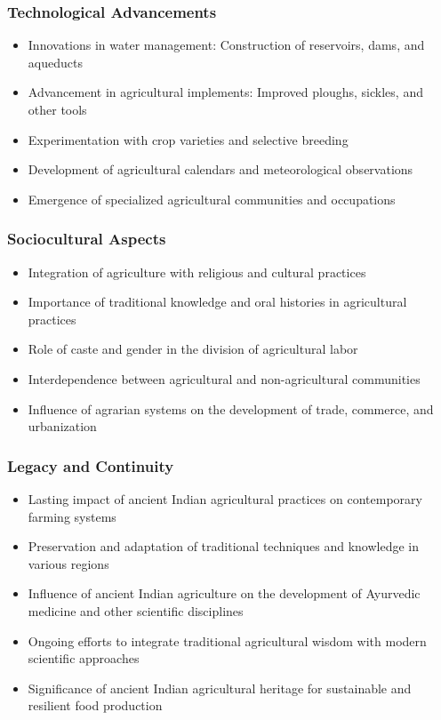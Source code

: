 \begin{frame}[fragile]\frametitle{Technological Advancements}
    \begin{itemize}
        \item Innovations in water management: Construction of reservoirs, dams, and aqueducts
        \item Advancement in agricultural implements: Improved ploughs, sickles, and other tools
        \item Experimentation with crop varieties and selective breeding
        \item Development of agricultural calendars and meteorological observations
        \item Emergence of specialized agricultural communities and occupations
    \end{itemize}
\end{frame}

\begin{frame}[fragile]\frametitle{Sociocultural Aspects}
    \begin{itemize}
        \item Integration of agriculture with religious and cultural practices
        \item Importance of traditional knowledge and oral histories in agricultural practices
        \item Role of caste and gender in the division of agricultural labor
        \item Interdependence between agricultural and non-agricultural communities
        \item Influence of agrarian systems on the development of trade, commerce, and urbanization
    \end{itemize}
\end{frame}

\begin{frame}[fragile]\frametitle{Legacy and Continuity}
    \begin{itemize}
        \item Lasting impact of ancient Indian agricultural practices on contemporary farming systems
        \item Preservation and adaptation of traditional techniques and knowledge in various regions
        \item Influence of ancient Indian agriculture on the development of Ayurvedic medicine and other scientific disciplines
        \item Ongoing efforts to integrate traditional agricultural wisdom with modern scientific approaches
        \item Significance of ancient Indian agricultural heritage for sustainable and resilient food production
    \end{itemize}
\end{frame}
